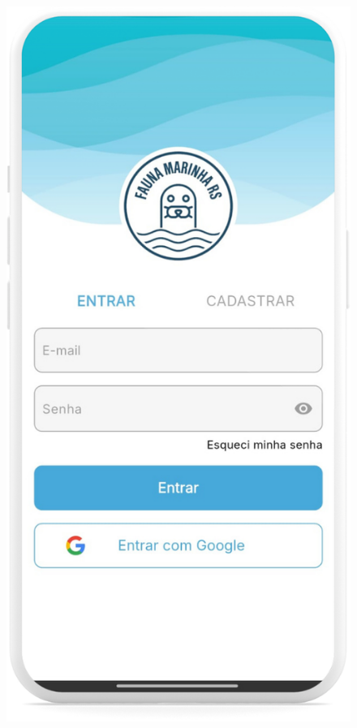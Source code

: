 \begin{figure}[H]
    \centering
    \begin{minipage}[t]{0.48\textwidth}
        \centering
        \includegraphics[height=0.72\textheight]{imagens/sistema/device_frame/login.png}

\end{minipage}
\end{figure}
